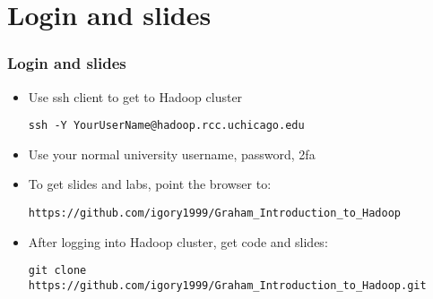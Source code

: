 \section{Login and slides}
\begin{frame}[fragile]
  \frametitle{Login and slides}

  \begin{itemize}
  \item Use ssh client to get to Hadoop cluster
    {\color{mycolorcli}
\begin{verbatim}
ssh -Y YourUserName@hadoop.rcc.uchicago.edu
\end{verbatim}
    }
  \item Use your normal university username, password, 2fa
  \item To get slides and labs, point the browser to:
    {\tiny
      {\color{mycolorcli}
\begin{verbatim}
https://github.com/igory1999/Graham_Introduction_to_Hadoop
\end{verbatim}
      }
    }
  \item After logging into Hadoop cluster, get code and slides:
    {\tiny
      {\color{mycolorcli}
\begin{verbatim}
git clone https://github.com/igory1999/Graham_Introduction_to_Hadoop.git
\end{verbatim}
      }
    }
  \end{itemize}
\end{frame}


